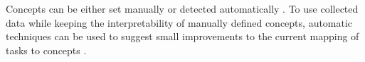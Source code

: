 %
%


Concepts can be either set manually or detected automatically
\cite{niznan-thesis, rihak-phd}. %
To use collected data while keeping the interpretability of manually defined
concepts, automatic techniques can be used to suggest small improvements to the
current mapping of tasks to concepts \cite[chapter 3]{its-domain-models}.






